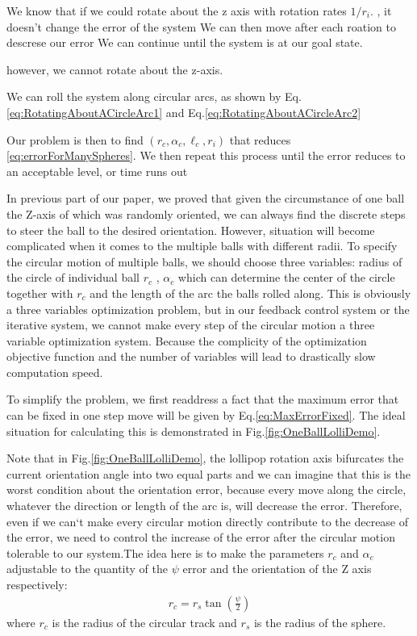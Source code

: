 \documentclass[letter paper, 10pt, conference]{ieeeconf}
\begin{document}
We know that if we could rotate about the z axis with rotation rates $1/r_i$.  , it doesn't change the error of the system
We can then move after each roation to descrese our error 
We can continue until the system is at our goal state.
 
 
however, we cannot rotate about the z-axis.

We can roll the system along circular arcs, as shown by Eq. \eqref{eq:RotatingAboutACircleArc1} and Eq.\eqref{eq:RotatingAboutACircleArc2}


Our problem is then to find $(r_c, \alpha_c, \ell_c, r_i)  $ that reduces \eqref{eq:errorForManySpheres}.  We then repeat this process until the error reduces to an acceptable level, or time runs out


In previous part of our paper, we proved that given the circumstance of one ball the Z-axis of which was randomly oriented, we can always find the discrete steps to steer the ball to the desired orientation. However, situation will become complicated when it comes to the multiple balls with different radii. To specify the circular motion of multiple balls, we should choose three variables: radius of the circle of individual ball $r_c$ , $\alpha_c$ which can determine the center of the circle together with $r_c$ and the length of the arc the balls rolled along. This is obviously a three variables optimization problem, but in our feedback control system or the iterative system, we cannot make every step of the circular motion a three variable optimization system. Because the complicity of the optimization objective function and the number of variables will lead to drastically slow computation speed.

To simplify the problem, we first readdress a fact that the maximum error that can be fixed in one step move will be given by Eq.\eqref{eq:MaxErrorFixed}. The ideal situation for calculating this is demonstrated in Fig.\ref{fig:OneBallLolliDemo}. 

Note that in Fig.\ref{fig:OneBallLolliDemo}, the lollipop rotation axis bifurcates the current orientation angle into two equal parts and we can imagine that this is the worst condition about the orientation error, because every move along the circle, whatever the direction or length of the arc is, will decrease the error. Therefore, even if we can`t make every circular motion directly contribute to the decrease of the error, we need to control the increase of the error after the circular motion tolerable to our system.The idea here is to make the parameters $r_c$ and $\alpha_c$ adjustable to the quantity of the $\psi$ error and the orientation of the Z axis respectively:
\begin{align}
r_c=r_s\tan(\frac{\psi}{2})\label{eq:OneBallLolliDecRc}
\end{align}
where $r_c$ is the radius of the circular track and $r_s$ is the radius of the sphere.
\end{document}
